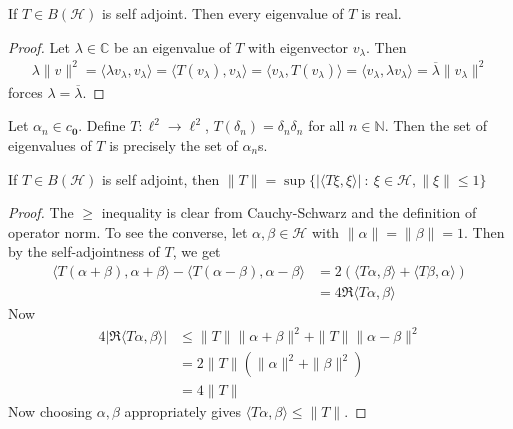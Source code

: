 

\begin{lemma}
  If $T \in B(\mathcal{H})$ is self adjoint. Then every eigenvalue of
  $T$ is real.
\end{lemma}
\begin{proof}
  Let $\lambda \in \mathbb{C}$ be an eigenvalue of $T$ with
  eigenvector $v_\lambda$. Then
  \begin{align*}
    \lambda \|v\|^2 = \langle \lambda v_\lambda ,  v_\lambda \rangle
    = \langle T(v_\lambda) ,   v_\lambda \rangle  = \langle v_\lambda
    ,  T(v_\lambda) \rangle  = \langle  v_\lambda ,  \lambda
    v_\lambda \rangle = \overline{\lambda}\|v_\lambda\|^2
  \end{align*}
  forces $\lambda =  \overline{\lambda}$.
\end{proof}

\begin{example}
  Let $\alpha_n \in c_{\textbf{0}}$. Define $T: \ell^2 \to \ell^2$,
  $T(\delta_n) = \delta_n \delta_n$ for all $ n \in \mathbb{N}$. Then
  the set of eigenvalues of $T$ is precisely the set of $\alpha_n$s.
\end{example}

\begin{lemma}
  \label{lem:spectrum_norm_self_adj}
  If $T \in B(\mathcal{H})$ is self adjoint, then $\|T\| =
  \sup\{|\langle T \xi ,  \xi \rangle| \ : \ \xi \in \mathcal{H},
  \|\xi\| \le 1\}$
\end{lemma}
\begin{proof}
  The $\ge$ inequality is clear from Cauchy-Schwarz and the
  definition of operator norm.
  To see the converse, let $\alpha, \beta \in \mathcal{H}$ with $
  \|\alpha\| = \|\beta\| = 1$. Then by
  the self-adjointness of $T$, we get
  \begin{align*}
    \langle T(\alpha + \beta) , \alpha + \beta \rangle  - \langle
    T(\alpha - \beta) ,   \alpha - \beta \rangle  &= 2 (\langle  T
    \alpha ,  \beta \rangle + \langle T \beta ,  \alpha \rangle  ) \\
    &= 4 \Re \langle T \alpha ,  \beta \rangle
  \end{align*}
  Now
  \begin{align*}
    4 |\Re \langle T \alpha ,  \beta \rangle | & \le \|T\| \|\alpha +
    \beta\|^2 + \|T\| \|\alpha - \beta\|^2 \\
    &=2 \|T\|(\|\alpha\|^2 + \|\beta\|^2) \\
    &=4 \|T\|
  \end{align*}
  Now choosing $\alpha, \beta$ appropriately gives $\langle  T \alpha
  ,  \beta \rangle \le \|T\|$.
\end{proof}

